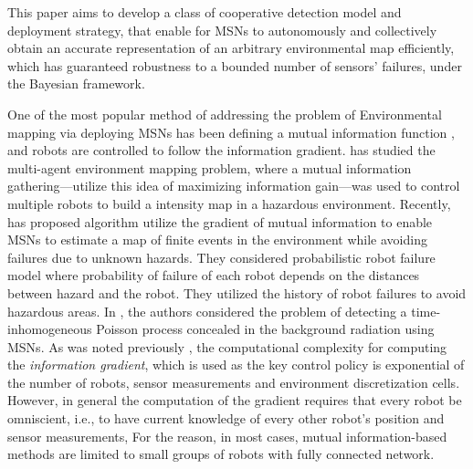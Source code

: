 \documentclass[letterpaper, 10 pt, conference]{ieeeconf}
\begin{document}
This paper aims to develop a class of cooperative detection model and deployment strategy, that enable for MSNs to autonomously and collectively obtain an accurate representation of an arbitrary environmental map efficiently, which has guaranteed robustness to a bounded number of sensors' failures, under the Bayesian framework.





One of the most popular method of addressing the problem of Environmental mapping via deploying MSNs has been defining a mutual information function \cite{shannon2001mathematical}, and robots are controlled to follow the information gradient.
\cite{cortez2011information} has studied the multi-agent environment mapping problem, where  a mutual information gathering---utilize this idea of maximizing information gain---was used to control multiple robots to build a intensity map in a hazardous environment. Recently, \cite{schwager2017multi} has proposed algorithm utilize the gradient of mutual information to enable MSNs to estimate a map of finite events in the environment while avoiding failures due to unknown hazards. They considered probabilistic robot failure model where probability of failure of each robot depends on the distances between hazard and the robot. They utilized the history of robot failures to avoid hazardous areas. In \cite{pahlajani2014networked}, the authors considered the problem of detecting a time-inhomogeneous Poisson process concealed in the background radiation using MSNs. As was noted previously \cite{schwager2017multi, julian2012distributed}, the computational complexity for computing the \emph{information gradient}, which is used as the key control policy is exponential of the number of robots, sensor measurements and environment discretization cells. 
However, in general the computation of the gradient requires that every robot be omniscient, i.e., to have current knowledge of every other robot’s position and sensor measurements, For the reason, in most cases, mutual information-based methods are limited to small groups of robots with fully connected network. 
\end{document}
